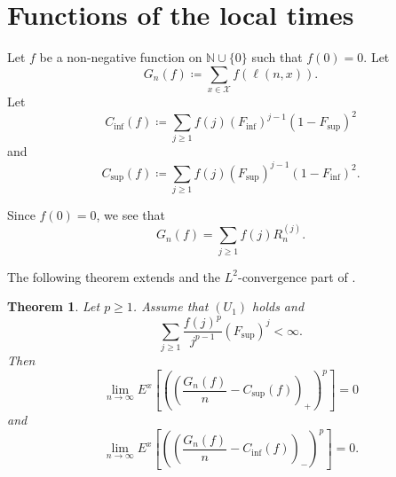 \documentclass[10pt,a4paper]{amsart}
\newtheorem{Thm}{Theorem}[section]
\begin{document}
\section{Functions of the local times}\label{sec:local-times}

Let $f$ be a non-negative function on $\mathbb{N} \cup \{0\}$ such that $f(0) = 0$. 
Let 
\[ G_n (f) \coloneqq \sum_{x \in \mathcal{X}} f(\ell(n,x)). \]
Let 
\[ C_{\inf}(f) \coloneqq \sum_{j \ge 1} f(j) (F_{\inf})^{j-1} (1-F_{\sup})^2 \]
and 
\[ C_{\sup}(f) \coloneqq \sum_{j \ge 1} f(j) (F_{\sup})^{j-1} (1-F_{\inf})^2. \]

Since $f(0) = 0$, we see that 
\[ G_n (f) = \sum_{j \ge 1} f(j) R_n^{(j)}. \] 


The following theorem extends  \cite[Theorem 2]{CCMP2026} and the $L^2$-convergence part of \cite[Theorem 1]{AK2020}. 


\begin{Thm}\label{thm:func-loc-time-Lp}
Let $p \ge 1$. 
Assume that  $(U_1)$ holds and 
\[ \sum_{j \ge 1} \frac{f(j)^p}{j^{p-1}} (F_{\sup})^{j} < \infty.  \]
Then 
\begin{equation}\label{eq:L2-sup-upper} 
\lim_{n \to \infty} E^x \left[ \left(\left( \frac{G_n (f)}{n} - C_{\sup}(f) \right)_{+}\right)^p \right] = 0 
\end{equation} 
and 
\begin{equation}\label{eq:L2-inf-lower}   
\lim_{n \to \infty} E^x \left[ \left(\left( \frac{G_n (f)}{n} - C_{\inf}(f) \right)_{-}\right)^p \right] = 0. 
\end{equation} 
\end{Thm}
\end{document}
